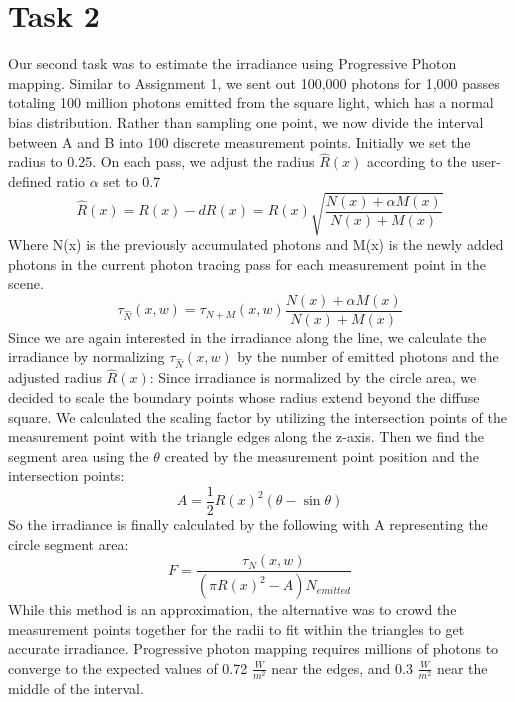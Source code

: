 \section*{Task 2}
Our second task was to estimate the irradiance using Progressive Photon mapping. Similar to Assignment 1, we sent out 100,000 photons for 1,000 passes totaling 100 million photons emitted from the square light, which has a normal bias distribution. Rather than sampling one point, we now divide the interval between A and B into 100 discrete measurement points. Initially we set the radius to 0.25. On each pass, we adjust the radius $ \hat{R}(x) $ according to the user-defined ratio $ \alpha $ set to 0.7
$$ \hat{R}(x) = R(x) - dR(x) = R(x)\sqrt{\frac{N(x)+\alpha M(x)}{N(x)+M(x)}} $$
Where N(x) is the previously accumulated photons and M(x) is the newly added photons in the current photon tracing pass for each measurement point in the scene.
$$ \tau_{\hat{N}}(x, w) = \tau_{N+M}(x, w)\frac{N(x) + \alpha M(x)}{N(x) + M(x)} $$
Since we are again interested in the irradiance along the line, we calculate the irradiance by normalizing $ \tau_{\hat{N}}(x, w) $ by the number of emitted photons and the adjusted radius  $ \hat{R}(x)$:
Since irradiance is normalized by the circle area, we decided to scale the boundary points whose radius extend beyond the diffuse square. We calculated the scaling factor by utilizing the intersection points of the measurement point with the triangle edges along the z-axis. Then we find the segment area using the $\theta$ created by the measurement point position and the intersection points:
$$ A = \frac{1}{2} R(x)^2 (\theta - \sin{\theta}) $$
So the irradiance is finally calculated by the following with A representing the circle segment area:
$$ F = \frac{\tau_{N}(x, w)}{(\pi R(x)^2 - A) N_{emitted}} $$
While this method is an approximation, the alternative was to crowd the measurement points together for the radii to fit within the triangles to get accurate irradiance. 
Progressive photon mapping requires millions of photons to converge to the expected values of  0.72 $ \frac{W}{m^2} $ near the edges, and 0.3 $ \frac{W}{m^2} $ near the middle of the interval.

